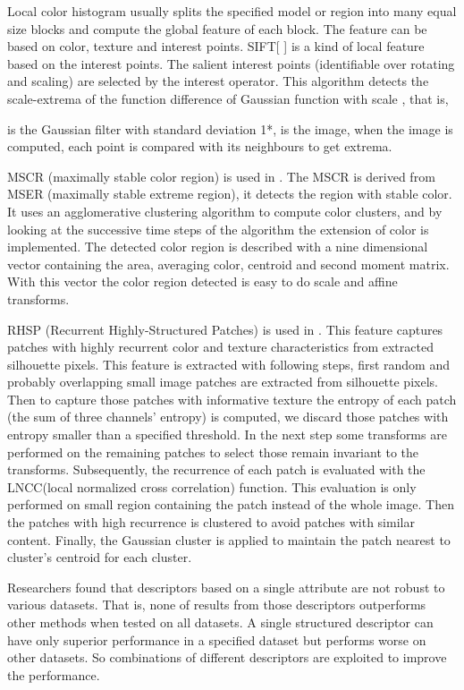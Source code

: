Local color histogram usually splits the specified model or region into many equal size blocks and compute the global feature of each block. The feature can be based on color, texture and interest points. SIFT[ ] is a kind of local feature based on the interest points. The salient interest points (identifiable over rotating and scaling) are selected by the interest operator. This algorithm detects the scale-extrema of the function difference of Gaussian function with scale , that is, 

 is the Gaussian filter with standard deviation 1*,  is the image, when the  image is computed, each point  is compared with its neighbours to get  extrema.

MSCR (maximally stable color region) is used in \cite{SDALF}. The MSCR is derived from MSER (maximally stable extreme region), it detects the region with stable color. It uses an agglomerative clustering algorithm to compute color clusters, and by looking at the successive time steps of the algorithm the extension of color is implemented. The detected color region is described with a nine dimensional vector containing the area, averaging color, centroid and second moment matrix. With this vector the color region detected is easy to do scale and affine transforms.

RHSP (Recurrent Highly-Structured Patches) is used in \cite{SDALF}. This feature captures patches with highly recurrent color and texture characteristics from extracted silhouette pixels. This feature is extracted with following steps, first random and probably overlapping small image patches are extracted from silhouette pixels. Then to capture those patches with informative texture the entropy of each patch (the sum of three channels' entropy) is computed, we discard those patches with entropy smaller than a specified threshold. In the next step some transforms are performed on the remaining patches to select those remain invariant to the transforms. Subsequently, the recurrence of each patch is evaluated with the LNCC(local normalized cross correlation) function. This evaluation is only performed on small region containing the patch instead of the whole image. Then the patches with high recurrence is clustered to avoid patches with similar content. Finally, the Gaussian cluster is applied to maintain the patch nearest to cluster's centroid for each cluster.
 
Researchers found that descriptors based on a single attribute are not robust to various datasets. That is, none of results from those descriptors outperforms other methods when tested on all datasets. A single structured descriptor can have only superior performance in a specified dataset but performs worse on other datasets. So combinations of different descriptors are exploited to improve the performance. 

